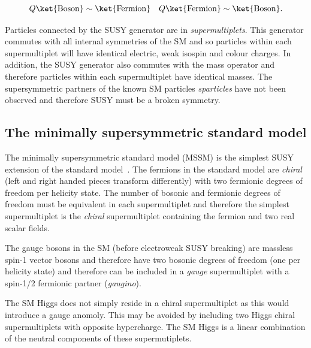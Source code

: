 \begin{equation}
Q\ket{\text{Boson}} \sim \ket{\text{Fermion}} \quad Q\ket{\text{Fermion}} \sim \ket{\text{Boson}}.
\end{equation}

Particles connected by the SUSY generator are in \emph{supermultiplets}. This generator commutes with all internal symmetries 
of the SM and so particles within each supermultiplet will have identical electric, weak isospin and colour charges.
In addition, the SUSY generator also commutes with the mass operator and therefore 
particles within each supermultiplet have identical masses. The supersymmetric partners of the 
known SM particles \emph{sparticles} have not been observed and therefore SUSY must be a broken symmetry.

%

\subsection{The minimally supersymmetric standard model}

The minimally supersymmetric standard model (MSSM) is the simplest SUSY extension of the standard model~\cite{SUSYP}.
The fermions in the standard model are \emph{chiral} (left and right handed pieces transform differently)
with two fermionic degrees of freedom per helicity state. The number of bosonic and fermionic degrees 
of freedom must be equivalent in each supermultiplet and therefore the simplest supermultiplet
is the \emph{chiral} supermultiplet containing the fermion and two real scalar fields.

The gauge bosons in the SM (before electroweak SUSY breaking) are massless spin-1 vector bosons
and therefore have two bosonic degrees of freedom (one per helicity state) and therefore
can be included in a \emph{gauge} supermultiplet with a spin-1/2 fermionic partner (\emph{gaugino}).

The SM Higgs does not simply reside in a chiral supermultiplet as this would introduce a 
gauge anomoly. This may be avoided by including two Higgs chiral supermultiplets with 
opposite hypercharge. The SM Higgs is a linear combination of the neutral components 
of these supermutiplets.

